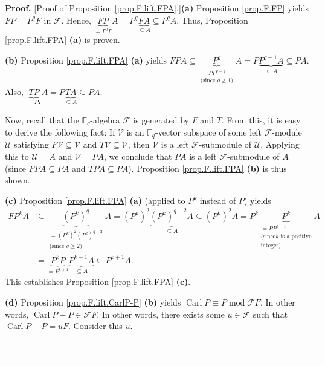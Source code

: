 \documentclass[numbers=enddot,12pt,final,onecolumn,notitlepage]{scrartcl}%
\theoremstyle{definition}
\newenvironment{proof}[1][Proof]{\noindent\textbf{#1.} }{\ \rule{0.5em}{0.5em}}
\begin{document}
\begin{proof}
[Proof of Proposition \ref{prop.F.lift.FPA}.]\textbf{(a)} Proposition
\ref{prop.F.FP} yields $FP=P^{q}F$ in $\mathcal{F}$. Hence, $\underbrace{FP}%
_{=P^{q}F}A=P^{q}\underbrace{FA}_{\subseteq A}\subseteq P^{q}A$. Thus,
Proposition \ref{prop.F.lift.FPA} \textbf{(a)} is proven. \medskip

\textbf{(b)} Proposition \ref{prop.F.lift.FPA} \textbf{(a)} yields
$FPA\subseteq\underbrace{P^{q}}_{\substack{=PP^{q-1}\\\text{(since }%
q\geq1\text{)}}}A=P\underbrace{P^{q-1}A}_{\subseteq A}\subseteq PA$. Also,
$\underbrace{TP}_{=PT}A=P\underbrace{TA}_{\subseteq A}\subseteq PA$.

Now, recall that the $\mathbb{F}_{q}$-algebra $\mathcal{F}$ is generated by
$F$ and $T$. From this, it is easy to derive the following fact: If
$\mathcal{V}$ is an $\mathbb{F}_{q}$-vector subspace of some left
$\mathcal{F}$-module $\mathcal{U}$ satisfying $F\mathcal{V}\subseteq
\mathcal{V}$ and $T\mathcal{V}\subseteq\mathcal{V}$, then $\mathcal{V}$ is a
left $\mathcal{F}$-submodule of $\mathcal{U}$. Applying this to $\mathcal{U}%
=A$ and $\mathcal{V}=PA$, we conclude that $PA$ is a left $\mathcal{F}%
$-submodule of $A$ (since $FPA\subseteq PA$ and $TPA\subseteq PA$).
Proposition \ref{prop.F.lift.FPA} \textbf{(b)} is thus shown. \medskip

\textbf{(c)} Proposition \ref{prop.F.lift.FPA} \textbf{(a)} (applied to
$P^{k}$ instead of $P$) yields%
\begin{align*}
FP^{k}A  &  \subseteq\underbrace{\left(  P^{k}\right)  ^{q}}%
_{\substack{=\left(  P^{k}\right)  ^{2}\left(  P^{k}\right)  ^{q-2}%
\\\text{(since }q\geq2\text{)}}}A=\left(  P^{k}\right)  ^{2}%
\underbrace{\left(  P^{k}\right)  ^{q-2}A}_{\subseteq A}\subseteq\left(
P^{k}\right)  ^{2}A=P^{k}\underbrace{P^{k}}_{\substack{=PP^{k-1}\\\text{(since
}k\text{ is a positive}\\\text{integer)}}}A\\
&  =\underbrace{P^{k}P}_{=P^{k+1}}\underbrace{P^{k-1}A}_{\subseteq A}\subseteq
P^{k+1}A.
\end{align*}
This establishes Proposition \ref{prop.F.lift.FPA} \textbf{(c)}. \medskip

\textbf{(d)} Proposition \ref{prop.F.lift.CarlP-P} \textbf{(b)} yields
$\operatorname*{Carl}P\equiv P\operatorname{mod}\mathcal{F}F$. In other words,
$\operatorname*{Carl}P-P\in\mathcal{F}F$. In other words, there exists some
$u\in\mathcal{F}$ such that $\operatorname*{Carl}P-P=uF$. Consider this $u$.


\end{proof}
\end{document}
